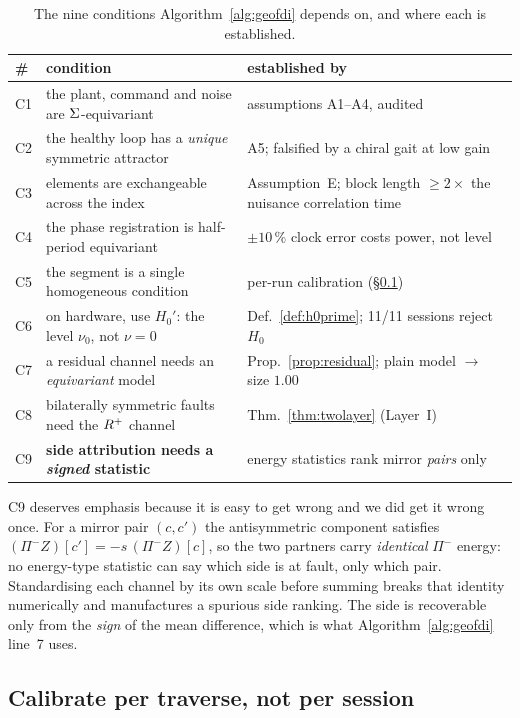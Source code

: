 \begin{table}[t]
\centering
\caption{The nine conditions Algorithm~\ref{alg:geofdi} depends on, and where each is established.}
\label{tab:conditions}
\footnotesize
\begin{tabular}{@{}p{0.5cm}p{4.6cm}p{2.4cm}@{}}
\toprule
\# & condition & established by \\
\midrule
C1 & the plant, command and noise are $\Sigma$-equivariant & assumptions A1--A4, audited \\
C2 & the healthy loop has a \emph{unique} symmetric attractor & A5; falsified by a chiral gait at low gain \\
C3 & elements are exchangeable across the index & Assumption~E; block length $\ge 2\times$ the nuisance correlation time \\
C4 & the phase registration is half-period equivariant & $\pm10\,\%$ clock error costs power, not level \\
C5 & the segment is a single homogeneous condition & per-run calibration (\S\ref{sec:percalib}) \\
C6 & on hardware, use $H_0'$: the level $\nu_0$, not $\nu=0$ & Def.~\ref{def:h0prime}; 11/11 sessions reject $H_0$ \\
C7 & a residual channel needs an \emph{equivariant} model & Prop.~\ref{prop:residual}; plain model $\rightarrow$ size $1.00$ \\
C8 & bilaterally symmetric faults need the $R^{+}$ channel & Thm.~\ref{thm:twolayer} (Layer~I) \\
C9 & \textbf{side attribution needs a \emph{signed} statistic} & energy statistics rank mirror \emph{pairs} only \\
\bottomrule
\end{tabular}
\end{table}

C9 deserves emphasis because it is easy to get wrong and we did get it wrong once. For a mirror pair $(c,c')$ the
antisymmetric component satisfies $(\Pi^-Z)[c']=-s\,(\Pi^-Z)[c]$, so the two partners carry \emph{identical} $\Pi^-$
energy: no energy-type statistic can say which side is at fault, only which pair. Standardising each channel by its own
scale before summing breaks that identity numerically and manufactures a spurious side ranking. The side is recoverable
only from the \emph{sign} of the mean difference, which is what Algorithm~\ref{alg:geofdi} line~7 uses.

\subsection{Calibrate per traverse, not per session}
\label{sec:percalib}

